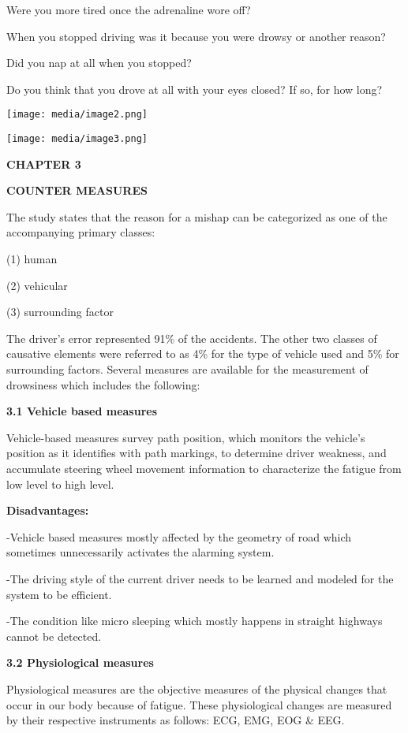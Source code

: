 \documentclass[a4paper,12pt]{article}
\begin{document}
Were you more tired once the adrenaline wore off?

When you stopped driving was it because you were drowsy or another
reason?

Did you nap at all when you stopped?

Do you think that you drove at all with your eyes closed? If so, for how
long?

\texttt{[image: media/image2.png]}

\texttt{[image: media/image3.png]}

\textbf{CHAPTER 3}

\textbf{COUNTER MEASURES}

The study states that the reason for a mishap can be categorized as one
of the accompanying primary classes:

(1) human

(2) vehicular

(3) surrounding factor

The driver's error represented 91\% of the accidents. The other two
classes of causative elements were referred to as 4\% for the type of
vehicle used and 5\% for surrounding factors. Several measures are
available for the measurement of drowsiness which includes the
following:

\textbf{3.1 Vehicle based measures}

Vehicle-based measures survey path position, which monitors the
vehicle's position as it identifies with path markings, to determine
driver weakness, and accumulate steering wheel movement information to
characterize the fatigue from low level to high level.

\textbf{Disadvantages:}

-Vehicle based measures mostly affected by the geometry of road which
sometimes unnecessarily activates the alarming system.

-The driving style of the current driver needs to be learned and modeled
for the system to be efficient.

-The condition like micro sleeping which mostly happens in straight
highways cannot be detected.

\textbf{3.2 Physiological measures}

Physiological measures are the objective measures of the physical
changes that occur in our body because of fatigue. These physiological
changes are measured by their respective instruments as follows: ECG,
EMG, EOG \& EEG.
\end{document}
